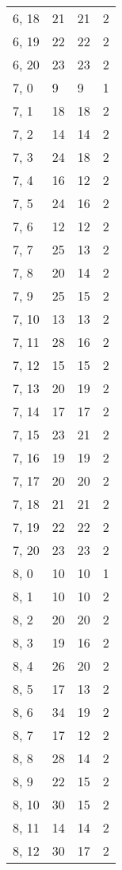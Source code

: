 \begin{table}
\begin{tabular}{llll}
6, 18  &   21 &   21 &     2 \\
6, 19  &   22 &   22 &     2 \\
6, 20  &   23 &   23 &     2 \\
7, 0   &    9 &    9 &     1 \\
7, 1   &   18 &   18 &     2 \\
7, 2   &   14 &   14 &     2 \\
7, 3   &   24 &   18 &     2 \\
7, 4   &   16 &   12 &     2 \\
7, 5   &   24 &   16 &     2 \\
7, 6   &   12 &   12 &     2 \\
7, 7   &   25 &   13 &     2 \\
7, 8   &   20 &   14 &     2 \\
7, 9   &   25 &   15 &     2 \\
7, 10  &   13 &   13 &     2 \\
7, 11  &   28 &   16 &     2 \\
7, 12  &   15 &   15 &     2 \\
7, 13  &   20 &   19 &     2 \\
7, 14  &   17 &   17 &     2 \\
7, 15  &   23 &   21 &     2 \\
7, 16  &   19 &   19 &     2 \\
7, 17  &   20 &   20 &     2 \\
7, 18  &   21 &   21 &     2 \\
7, 19  &   22 &   22 &     2 \\
7, 20  &   23 &   23 &     2 \\
8, 0   &   10 &   10 &     1 \\
8, 1   &   10 &   10 &     2 \\
8, 2   &   20 &   20 &     2 \\
8, 3   &   19 &   16 &     2 \\
8, 4   &   26 &   20 &     2 \\
8, 5   &   17 &   13 &     2 \\
8, 6   &   34 &   19 &     2 \\
8, 7   &   17 &   12 &     2 \\
8, 8   &   28 &   14 &     2 \\
8, 9   &   22 &   15 &     2 \\
8, 10  &   30 &   15 &     2 \\
8, 11  &   14 &   14 &     2 \\
8, 12  &   30 &   17 &     2 \\

\end{tabular}
\end{table}
